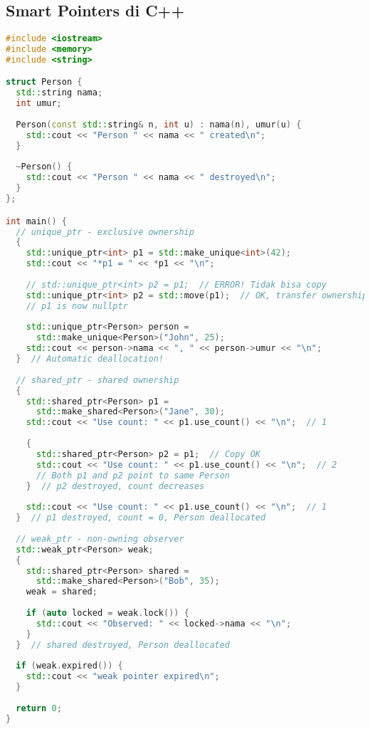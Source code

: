 \documentclass[../main.tex]{subfiles}
\begin{document}
\subsection{Smart Pointers di C++}

\begin{lstlisting}[language=C++, caption={Smart pointers di C++}]
#include <iostream>
#include <memory>
#include <string>

struct Person {
  std::string nama;
  int umur;
  
  Person(const std::string& n, int u) : nama(n), umur(u) {
    std::cout << "Person " << nama << " created\n";
  }
  
  ~Person() {
    std::cout << "Person " << nama << " destroyed\n";
  }
};

int main() {
  // unique_ptr - exclusive ownership
  {
    std::unique_ptr<int> p1 = std::make_unique<int>(42);
    std::cout << "*p1 = " << *p1 << "\n";
    
    // std::unique_ptr<int> p2 = p1;  // ERROR! Tidak bisa copy
    std::unique_ptr<int> p2 = std::move(p1);  // OK, transfer ownership
    // p1 is now nullptr
    
    std::unique_ptr<Person> person = 
      std::make_unique<Person>("John", 25);
    std::cout << person->nama << ", " << person->umur << "\n";
  }  // Automatic deallocation!
  
  // shared_ptr - shared ownership
  {
    std::shared_ptr<Person> p1 = 
      std::make_shared<Person>("Jane", 30);
    std::cout << "Use count: " << p1.use_count() << "\n";  // 1
    
    {
      std::shared_ptr<Person> p2 = p1;  // Copy OK
      std::cout << "Use count: " << p1.use_count() << "\n";  // 2
      // Both p1 and p2 point to same Person
    }  // p2 destroyed, count decreases
    
    std::cout << "Use count: " << p1.use_count() << "\n";  // 1
  }  // p1 destroyed, count = 0, Person deallocated
  
  // weak_ptr - non-owning observer
  std::weak_ptr<Person> weak;
  {
    std::shared_ptr<Person> shared = 
      std::make_shared<Person>("Bob", 35);
    weak = shared;
    
    if (auto locked = weak.lock()) {
      std::cout << "Observed: " << locked->nama << "\n";
    }
  }  // shared destroyed, Person deallocated
  
  if (weak.expired()) {
    std::cout << "weak pointer expired\n";
  }
  
  return 0;
}
\end{lstlisting}
\end{document}
